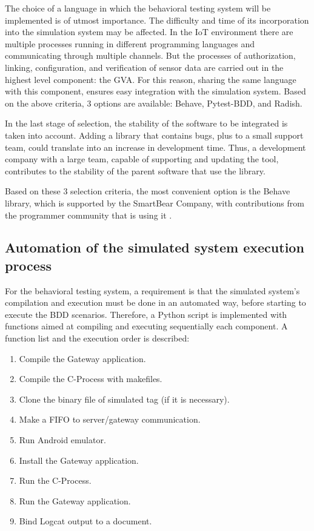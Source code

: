 \documentclass[journal]{IEEEtran}	%
\begin{document}
The choice of a language in which the behavioral testing system will be implemented is of utmost importance. The difficulty and time of its incorporation into the simulation system may be affected. In the IoT environment there are multiple processes running in different programming languages and communicating through multiple channels. But the processes of authorization, linking, configuration, and verification of sensor data are carried out in the highest level component: the GVA. For this reason, sharing the same language with this component, ensures easy integration with the simulation system. Based on the above criteria, 3 options are available: Behave, Pytest-BDD, and Radish.

In the last stage of selection, the stability of the software to be integrated is taken into account. Adding a library that contains bugs, plus to a small support team, could translate into an increase in development time. Thus, a development company with a large team, capable of supporting and updating the tool, contributes to the stability of the parent software that use the library.

Based on these 3 selection criteria, the most convenient option is the Behave library, which is supported by the SmartBear Company, with contributions from the programmer community that is using it \cite{behave2021github}.


\subsection{Automation of the simulated system execution process}


For the behavioral testing system, a requirement is that the simulated system's compilation and execution must be done in an automated way, before starting to execute the BDD scenarios. Therefore, a Python script is implemented with functions aimed at compiling and executing sequentially each component. A function list and the execution order is described:

\begin{enumerate}
    \item Compile the Gateway application.
    \item Compile the C-Process with makefiles.
    \item Clone the binary file of simulated tag (if it is necessary).
    \item Make a FIFO to server/gateway communication.
    \item Run Android emulator.
    \item Install the Gateway application.
    \item Run the C-Process.
    \item Run the Gateway application.
    \item Bind Logcat output to a document.
\end{enumerate}
\end{document}
